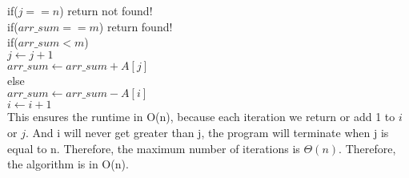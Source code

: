 \documentclass[12pt]{article}
\begin{document}
\begin{enumerate}
		\hphantom{11111111}if($j == n$)	return not found!\\
		\hphantom{11111111}if($arr\_sum == m$) return found!\\
		\hphantom{11111111}if($arr\_sum < m$)\\
		\hphantom{111111111111}$j\gets j+1$\\
		\hphantom{111111111111}$arr\_sum\gets arr\_sum + A[j]$\\
		\hphantom{11111111}else\\
		\hphantom{111111111111}$arr\_sum\gets arr\_sum - A[i]$\\
		\hphantom{111111111111}$i\gets i+1$\\
		This ensures the runtime in O(n), because each iteration we return or add 1 to $i$ or $j$. And i will never get greater than j, the program will terminate when j is equal to n. Therefore, the maximum number of iterations is $\Theta(n)$. Therefore, the algorithm is in O(n).
		
	\end{enumerate}
	
\end{document}
